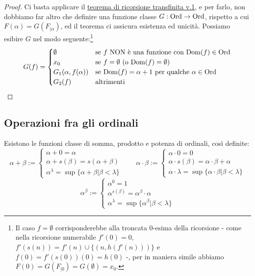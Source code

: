 \begin{proof}
	Ci basta applicare il \hyperref[ric_transf1]{teorema di ricorsione transfinita v.1}, e per farlo, non dobbiamo far altro che definire una funzione classe $G : \operatorname{Ord} \rightarrow \operatorname{Ord}$, rispetto a cui $F(\alpha) = G(F_{|\alpha})$, ed il teorema ci assicura esistenza ed unicità.
	Possiamo esibire $G$ nel modo seguente:\footnote{Il caso $f = \emptyset$ corrisponderebbe alla troncata 0-esima della ricorsione - come nella ricorsione numerabile $f'(0) = 0$, $f'(s(n)) = f'(n) \cup \{(n,h(f'(n)))\}$ e $f(0) = f'(s(0))(0) = h(0)$ -, per in maniera simile abbiamo $F(0) = G(F_{|0}) = G(\emptyset) = x_0$.}
	\[ G(f) = \begin{cases}
		\emptyset &\text{se $f$ NON è una funzione con $\operatorname{Dom}(f) \in \operatorname{Ord}$} \\
		x_0 &\text{se $f = \emptyset$ (o $\operatorname{Dom}(f) = \emptyset$)} \\
		G_1(\alpha,f(\alpha)) &\text{se $\operatorname{Dom}(f) = \alpha + 1$ per qualche $\alpha \in \operatorname{Ord}$} \\
		G_2(f) &\text{altrimenti}
	\end{cases}
		\]
\end{proof}

\subsection{Operazioni fra gli ordinali}

\begin{definition}
	Esistono le funzioni classe di somma, prodotto e potenza di ordinali, così definite:
	\[ \alpha + \beta :=\begin{cases}
		\alpha + 0 = \alpha \\
		\alpha + s(\beta) = s(\alpha + \beta) \\
		\alpha^\lambda = \sup\{\alpha + \beta | \beta < \lambda\} 
	\end{cases}
	\qquad
	\alpha \cdot \beta :=\begin{cases}
		\alpha \cdot 0 = 0 \\
		\alpha \cdot s(\beta) = \alpha \cdot \beta + \alpha \\
		\alpha\cdot \lambda = \sup\{\alpha \cdot \beta | \beta < \lambda\}
	\end{cases}
		\]
	\[ \alpha^\beta :=\begin{cases}
		\alpha^0 = 1 \\
		\alpha^{s(\beta)} = \alpha^\beta \cdot \alpha \\
		\alpha^{\lambda} = \sup\{\alpha^\beta | \beta < \lambda\}
	\end{cases}
		\]
\end{definition}

